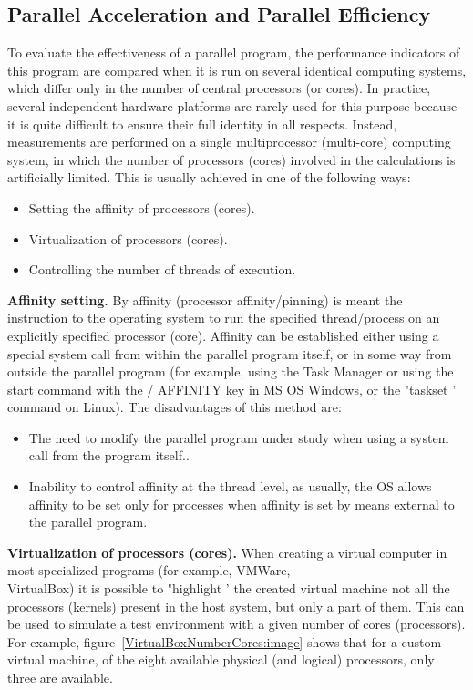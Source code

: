 { %
	\subsection{Parallel Acceleration and Parallel Efficiency}
	\par To evaluate the effectiveness of a parallel program, the performance indicators of this program are compared when it is run on several identical computing systems, which differ only in the number of central processors (or cores). In practice, several independent hardware platforms are rarely used for this purpose because it is quite difficult to ensure their full identity in all respects. Instead, measurements are performed on a single multiprocessor (multi-core) computing system, in which the number of processors (cores) involved in the calculations is artificially limited. This is usually achieved in one of the following ways:
	\begin{itemize}
		\item Setting the affinity of processors (cores).
		\item Virtualization of processors (cores).
		\item Controlling the number of threads of execution.
	\end{itemize}
	\textbf{Affinity setting.} By affinity (processor affinity/pinning) is meant the instruction to the operating system to run the specified thread/process on an explicitly specified processor (core). Affinity can be established either using a special system call from within the parallel program itself, or in some way from outside the parallel program (for example, using the Task Manager or using the start command with the / AFFINITY key in MS OS Windows, or the "taskset ' command on Linux). The disadvantages of this method are:
	\begin{itemize}
		\item The need to modify the parallel program under study when using a system call from the program itself..
		\item Inability to control affinity at the thread level, as usually, the OS allows affinity to be set only for processes when affinity is set by means external to the parallel program.
	\end{itemize}
	\textbf{Virtualization of processors (cores).} When creating a virtual computer in most specialized programs (for example, VMWare, \\VirtualBox) it is possible to "highlight ' the created virtual machine not all the processors (kernels) present in the host system, but only a part of them. This can be used to simulate a test environment with a given number of cores (processors). For example,  figure~\ref{VirtualBoxNumberCores:image} shows that for a custom virtual machine, of the eight available physical (and logical) processors, only three are available.
}
